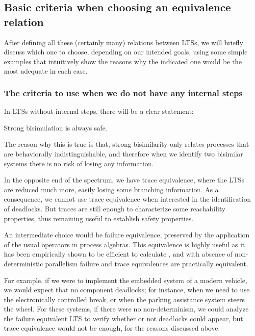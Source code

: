 \documentclass[11pt]{article}
\theoremstyle{definition}
\theoremstyle{plain}
\theoremstyle{definition}
\begin{document}
\subsection{Basic criteria when choosing an equivalence relation}
After defining all these (certainly many) relations between LTSs, we will briefly discuss which one to choose, depending on our intended goals, using some simple examples that intuitively show the reasons why the indicated one would be the most adequate in each case.

\subsubsection{The criteria to use when we do not have any internal steps}
In LTSs without internal steps, there will be a clear statement:
\begin{center}
	Strong bisimulation is always safe.
\end{center}

The reason why this is true is that, strong bisimilarity only relates processes that are behaviorally indistinguishable, and therefore when we identify two bisimilar systems there is no risk of losing any information.

In the opposite end of the spectrum, we have trace equivalence, where the LTSs are reduced much more, easily losing some branching information. As a consequence, we cannot use trace equivalence when interested in the identification of deadlocks. But traces are still enough to characterize some reachability properties, thus remaining useful to establish safety properties.

An intermediate choice would be failure equivalence, preserved by the application of the usual operators in process algebras. This equivalence is highly useful as it has been empirically shown to be efficient to calculate \cite{valmari1995failure}, and with absence of non-deterministic parallelism failure and trace equivalences are practically equivalent.

For example, if we were to implement the embedded system of a modern vehicle, we would expect that no component deadlocks; for instance, when we need to use the electronically controlled break, or when the parking assistance system steers the wheel. For these systems, if there were no non-determinism, we could analyze the failure equivalent LTS to verify whether or not deadlocks could appear, but trace equivalence would not be enough, for the reasons discussed above.
\end{document}
